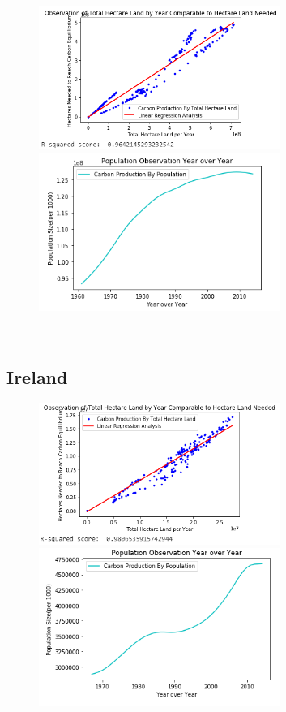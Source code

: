 \documentclass[journal,onecolumn]{IEEEtran}
\begin{document}
     \begin{figure}[h]
	\centering
  	\includegraphics[width=0.7\textwidth]{img/Japan-Carbon.png}
  	  	\includegraphics[width=0.7\textwidth]{img/Japan-Population.png}
\end{figure}\\

\newpage

\subsection{\centering Ireland}
     
     \begin{figure}[h]
	\centering
  	\includegraphics[width=0.7\textwidth]{img/Ireland-Carbon.png}
  	  	\includegraphics[width=0.7\textwidth]{img/Ireland-Population.png}
\end{figure}\\
\end{document}

